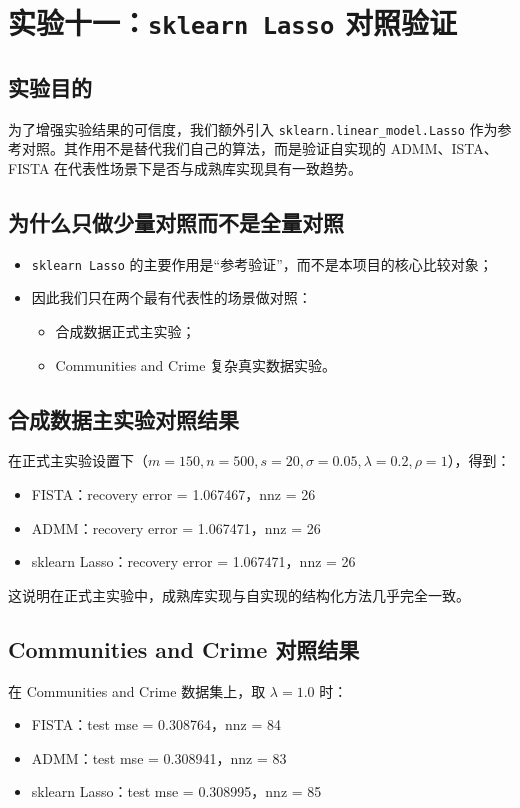 \documentclass[12pt,a4paper]{ctexart}
\begin{document}
\section{实验十一：\texttt{sklearn Lasso} 对照验证}
\subsection{实验目的}
为了增强实验结果的可信度，我们额外引入 \texttt{sklearn.linear\_model.Lasso} 作为参考对照。其作用不是替代我们自己的算法，而是验证自实现的 ADMM、ISTA、FISTA 在代表性场景下是否与成熟库实现具有一致趋势。

\subsection{为什么只做少量对照而不是全量对照}
\begin{itemize}[leftmargin=2em]
    \item \texttt{sklearn Lasso} 的主要作用是“参考验证”，而不是本项目的核心比较对象；
    \item 因此我们只在两个最有代表性的场景做对照：
    \begin{itemize}[leftmargin=2em]
        \item 合成数据正式主实验；
        \item Communities and Crime 复杂真实数据实验。
    \end{itemize}
\end{itemize}

\subsection{合成数据主实验对照结果}
在正式主实验设置下（$m=150,n=500,s=20,\sigma=0.05,\lambda=0.2,\rho=1$），得到：
\begin{itemize}[leftmargin=2em]
    \item FISTA：recovery error = 1.067467，nnz = 26
    \item ADMM：recovery error = 1.067471，nnz = 26
    \item sklearn Lasso：recovery error = 1.067471，nnz = 26
\end{itemize}

这说明在正式主实验中，成熟库实现与自实现的结构化方法几乎完全一致。

\subsection{Communities and Crime 对照结果}
在 Communities and Crime 数据集上，取 $\lambda=1.0$ 时：
\begin{itemize}[leftmargin=2em]
    \item FISTA：test mse = 0.308764，nnz = 84
    \item ADMM：test mse = 0.308941，nnz = 83
    \item sklearn Lasso：test mse = 0.308995，nnz = 85
\end{itemize}
\end{document}
